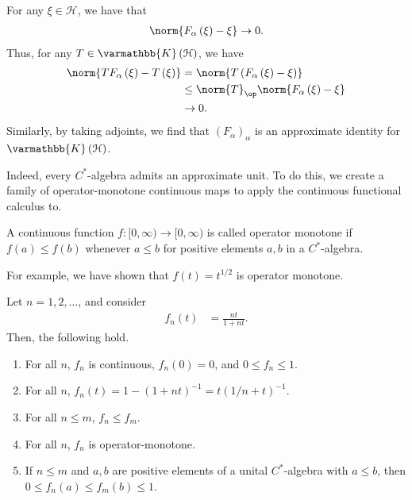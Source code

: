 \documentclass[10pt]{mypackage}
\renewcommand*{\mathbb}[1]{\varmathbb{#1}}
\newcommand{\K}{\mathbb{K}}
\begin{document}
\begin{solution}
  For any $\xi\in \mathcal{H}$, we have that
  \begin{align*}
    \norm{F_{\alpha}\left(\xi\right) - \xi}\rightarrow 0.
  \end{align*}
  Thus, for any $T\in \K\left(\mathcal{H}\right)$, we have
  \begin{align*}
    \norm{TF_{\alpha}\left(\xi\right) - T\left(\xi\right)} &= \norm{T\left(F_{\alpha}\left(\xi\right) - \xi\right)}\\
                                                           &\leq \norm{T}_{\op}\norm{F_{\alpha}\left(\xi\right) - \xi}\\
                                                           &\rightarrow 0.
  \end{align*}
  Similarly, by taking adjoints, we find that $\left(F_{\alpha}\right)_{\alpha}$ is an approximate identity for $\K\left(\mathcal{H}\right)$.
\end{solution}
Indeed, every $C^{\ast}$-algebra admits an approximate unit. To do this, we create a family of operator-monotone continuous maps to apply the continuous functional calculus to.
\begin{definition}
  A continuous function $f\colon [0,\infty)\rightarrow [0,\infty)$ is called operator monotone if $f\left(a\right) \leq f\left(b\right)$ whenever $a\leq b$ for positive elements $a,b$ in a $C^{\ast}$-algebra.
\end{definition}
For example, we have shown that $f(t) = t^{1/2}$ is operator monotone.
\begin{lemma}
  Let $n = 1,2,\dots$, and consider
  \begin{align*}
    f_n\left(t\right) &= \frac{nt}{1 + nt}.
  \end{align*}
  Then, the following hold.
  \begin{enumerate}[(1)]
    \item For all $n$, $f_n$ is continuous, $f_n(0) = 0$, and $0 \leq f_n \leq 1$.
    \item For all $n$, $f_n(t) = 1 - \left(1+nt\right)^{-1} = t\left(1/n + t\right)^{-1} $.
    \item For all $n\leq m$, $f_n\leq f_m$.
    \item For all $n$, $f_n$ is operator-monotone.
    \item If $n\leq m$ and $a,b$ are positive elements of a unital $C^{\ast}$-algebra with $a\leq b$, then $0\leq f_n\left(a\right)\leq f_m\left(b\right) \leq 1$.
  \end{enumerate}
\end{lemma}
\end{document}
